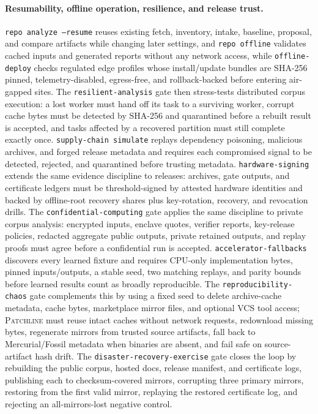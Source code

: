 \documentclass[11pt]{article}
\newcommand{\tool}{\textsc{Patchline}}
\newcommand{\code}[1]{\texttt{#1}}
\begin{document}
\paragraph{Resumability, offline operation, resilience, and release trust.} \code{repo analyze --resume} reuses existing fetch,
inventory, intake, baseline, proposal, and compare artifacts while changing later settings, and
\code{repo offline} validates cached inputs and generated reports without any network access, while
\code{offline-deploy} checks regulated edge profiles whose install/update bundles are SHA-256 pinned,
telemetry-disabled, egress-free, and rollback-backed before entering air-gapped sites. The
\code{resilient-analysis} gate then stress-tests distributed corpus execution: a lost worker must hand
off its task to a surviving worker, corrupt cache bytes must be detected by SHA-256 and quarantined
before a rebuilt result is accepted, and tasks affected by a recovered partition must still complete
exactly once. \code{supply-chain simulate} replays dependency poisoning, malicious archives, and forged
release metadata and requires each compromised signal to be detected, rejected, and quarantined before
trusting metadata. \code{hardware-signing} extends the same evidence discipline to releases: archives, gate
outputs, and certificate ledgers must be threshold-signed by attested hardware identities and backed by
offline-root recovery shares plus key-rotation, recovery, and revocation drills. The
\code{confidential-computing} gate applies the same discipline to private corpus analysis: encrypted
inputs, enclave quotes, verifier reports, key-release policies, redacted aggregate public outputs,
private retained outputs, and replay proofs must agree before a confidential run is accepted.
\code{accelerator-fallbacks} discovers every learned fixture and requires CPU-only implementation bytes,
pinned inputs/outputs, a stable seed, two matching replays, and parity bounds before learned results
count as broadly reproducible. The
\code{reproducibility-chaos} gate complements this by using a fixed seed to delete archive-cache
metadata, cache bytes, marketplace mirror files, and optional VCS tool access; \tool{} must reuse
intact caches without network requests, redownload missing bytes, regenerate mirrors from trusted
source artifacts, fall back to Mercurial/Fossil metadata when binaries are absent, and fail safe on
source-artifact hash drift. The \code{disaster-recovery-exercise} gate closes the loop by rebuilding the public corpus, hosted docs,
release manifest, and certificate logs, publishing each to checksum-covered mirrors, corrupting three
primary mirrors, restoring from the first valid mirror, replaying the restored certificate log, and
rejecting an all-mirrors-lost negative control.
\end{document}

